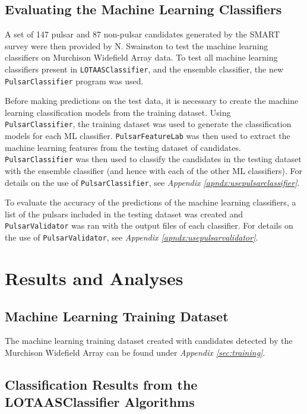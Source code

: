 \documentclass{article}
\begin{document}
\subsection{Evaluating the Machine Learning Classifiers}

A set of 147 pulsar and 87 non-pulsar candidates generated by the SMART survey were then provided by N. Swainston to test the machine learning classifiers on Murchison Widefield Array data. To test all machine learning classifiers present in \verb|LOTAASClassifier|, and the ensemble classifier, the new \\\verb|PulsarClassifier| program was used.

Before making predictions on the test data, it is necessary to create the machine learning classification models from the training dataset. Using \\\verb|PulsarClassifier|, the training dataset was used to generate the classification models for each ML classifier. \verb|PulsarFeatureLab| was then used to extract the machine learning features from the testing dataset of candidates. \verb|PulsarClassifier| was then used to classify the candidates in the testing dataset with the ensemble classifier (and hence with each of the other ML classifiers). For details on the use of \verb|PulsarClassifier|, see \emph{Appendix \ref{apndx:usepulsarclassifier}}.

To evaluate the accuracy of the predictions of the machine learning classifiers, a list of the pulsars included in the testing dataset was created and \verb|PulsarValidator| was ran with the output files of each classifier. For details on the use of \verb|PulsarValidator|, see \emph{Appendix \ref{apndx:usepulsarvalidator}}.

\pagebreak
\section{Results and Analyses}
\subsection{Machine Learning Training Dataset}

The machine learning training dataset created with candidates detected by the Murchison Widefield Array can be found under \emph{Appendix \ref{sec:training}}.

\subsection{Classification Results from the LOTAASClassifier Algorithms}
\end{document}
